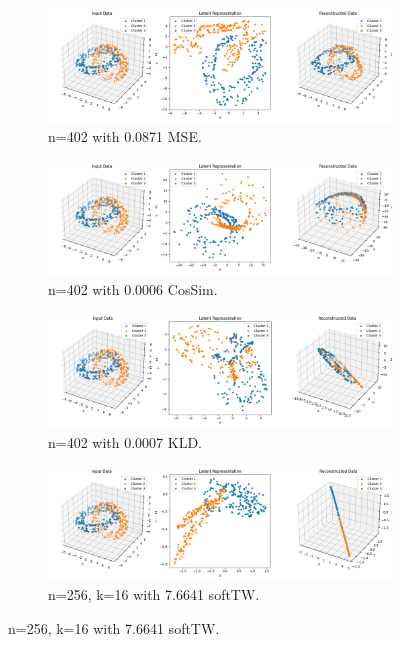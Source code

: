 \begin{figure}[htbp]
  \centering
  \begin{subfigure}[b]{1.0\textwidth}
    \centering
    \includegraphics[width=\linewidth]{images/RQ2/mse/3DTorus_-1_0.0871.png}
    \caption{n=402 with 0.0871 MSE.}
    \label{fig:RQ2/mse/3DTorus}
  \end{subfigure}
  \hfill
  \begin{subfigure}[b]{1.0\textwidth}
    \centering
    \includegraphics[width=\linewidth]{images/RQ2/csi/3DTorus_2_0.0006.png}
    \caption{n=402 with 0.0006 CosSim.}
    \label{fig:RQ2/csi/3DTorus}
  \end{subfigure}
  \hfill
  \begin{subfigure}[b]{1.0\textwidth}
    \centering
    \includegraphics[width=\linewidth]{images/RQ2/kld/3DTorus_-1_0.0007.png}
    \caption{n=402 with 0.0007 KLD.}
    \label{fig:RQ2/kld/3DTorus}
  \end{subfigure}
  \hfill
  \begin{subfigure}[b]{1.0\textwidth}
    \centering
    \includegraphics[width=\linewidth]{images/RQ2/tru/3DTorus_256n_16k_7.6641.png}
    \caption{n=256, k=16 with 7.6641 softTW.}
    \label{fig:RQ2/tru/3DTorus}
  \end{subfigure}


\end{figure}
